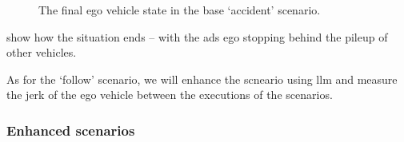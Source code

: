 \begin{figure}[htb]
    \centering
    \hfill
    \caption{The final ego vehicle state in the base `accident' scenario.}
    \label{fig:accidentBaseStoppedVisual}
\end{figure}

 show how the situation ends -- with the \acrshort{ads} ego
stopping behind the pileup of other vehicles.

As for the `follow' scenario, we will enhance the scneario using \acrshort{llm} and measure the
jerk of the ego vehicle between the executions of the scenarios.

\subsubsection{Enhanced scenarios}

